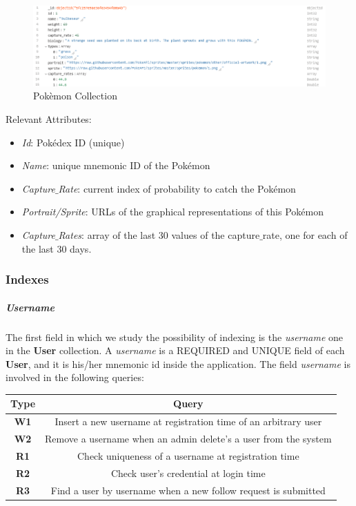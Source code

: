 \begin{figure}[H]
	\centering
	\includegraphics[width=\textwidth]{img/pokemon_collection.png}
	\caption{Pokèmon Collection}
\end{figure}
Relevant Attributes:
\begin{itemize}
	\item \textit{Id}: Pokédex ID (unique)
	\item \textit{Name}: unique mnemonic ID of the Pokémon
	\item \textit{Capture$\_$Rate}: current index of probability to catch the Pokémon
	\item \textit{Portrait/Sprite}: URLs of the graphical representations of this Pokémon
	\item \textit{Capture$\_$Rates}: array of the last 30 values of the capture$\_$rate, one for each of the last 30 days.
\end{itemize}

\subsubsection{Indexes}

\subparagraph{Username}
The first field in which we study the possibility of indexing is the \textit{username} one in the \textbf{User} collection. A \textit{username} is a REQUIRED and UNIQUE field of each \textbf{User}, and it is his/her mnemonic id inside the application.
The field \textit{username} is involved in the following queries:
\begin{center}
	\begin{tabular}{|c | c |} 
		\hline
		\textbf{Type} & \textbf{Query} \\ [0.5ex] 
		\hline
		\textbf{W1} & Insert a new username at registration time of an arbitrary user \\ 
		\hline
		\textbf{W2} & Remove a username when an admin delete’s a user from the system \\
		\hline
		\textbf{R1} & Check uniqueness of a username at registration time \\
		\hline
		\textbf{R2} & Check user’s credential at login time \\
		\hline
		\textbf{R3} & Find a user by username when a new follow request is submitted \\
		\hline
	\end{tabular}
\end{center}

